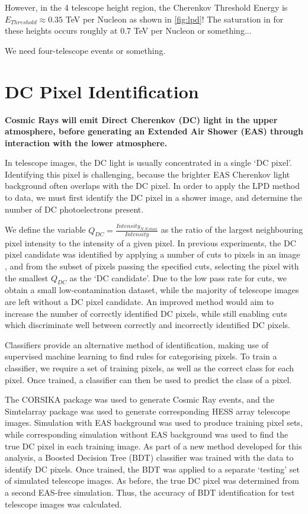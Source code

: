 \documentclass{article}
\begin{document}
However, in the 4 telescope height region, the Cherenkov Threshold Energy is $ E_{Threshold} \approx 0.35$ TeV per Nucleon as shown in \ref{fig:lpd}! The saturation in for these heights occurs roughly at 0.7 TeV per Nucleon or something...

We need four-telescope events or something.

\section{DC Pixel Identification}
\textbf{Cosmic Rays will emit Direct Cherenkov (DC) light in the upper atmosphere, before generating an Extended Air Shower (EAS) through interaction with the lower atmosphere. }

In telescope images, the DC light is usually concentrated in a single  \textquoteleft DC pixel'. Identifying this pixel is challenging, because the brighter EAS Cherenkov light background often overlaps with the DC pixel. In order to apply the LPD method to data, we must first identify the DC pixel in a shower image, and determine the number of DC photoelectrons present. 

We define the variable $Q_{DC} = \frac{Intensity_{N.N.max}}{Intensity}$ as the ratio of the largest neighbouring pixel intensity to the intensity of a given pixel. In previous experiments, the DC pixel candidate was identified by applying a number of cuts to pixels in an image \cite{hess07}, and from the subset of pixels passing the specified cuts, selecting the pixel with the smallest $Q_{DC}$ as the \textquoteleft DC candidate'. Due to the low pass rate for cuts, we obtain a small low-contamination dataset, while the majority of telescope images are left without a DC pixel candidate. An improved method would aim to increase the number of correctly identified DC pixels, while still enabling cuts which discriminate well between correctly and incorrectly identified DC pixels.

Classifiers provide an alternative method of identification, making use of supervised machine learning to find rules for categorising pixels. To train a classifier, we require a set of training pixels, as well as the correct class for each pixel. Once trained, a classifier can then be used to predict the class of a pixel.

The CORSIKA package \cite{Heck98} was used to generate Cosmic Ray events, and the Sim\textunderscore telarray package  \cite{Bernlohr08} was used to generate corresponding HESS array telescope images.  Simulation with EAS background was used to produce training pixel sets, while corresponding simulation without EAS background was used to find the true DC pixel in each training image. As part of a new method developed for this analysis, a Boosted Decision Tree (BDT) classifier was trained with the data to identify DC pixels. Once trained, the BDT was applied to a separate \textquoteleft testing' set of simulated telescope images. As before, the true DC pixel was determined from a second EAS-free simulation. Thus, the accuracy of BDT identification for test telescope images was calculated.
\end{document}
